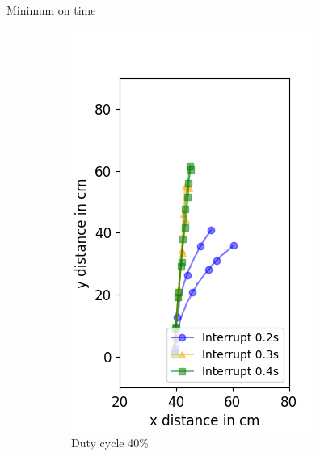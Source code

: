 \documentclass{beamer}
\begin{document}
\begin{frame}{Minimum on time}
	\begin{figure}
		\centering
		\begin{subfigure}[b]{0.28\textwidth}
			\includegraphics[width=\textwidth]{pics/figure_40.png}
			\caption*{Duty cycle 40\%}
		\end{subfigure}
		\hspace{2em}
		\begin{subfigure}[b]{0.28\textwidth}

\end{subfigure}
\end{figure}
\end{frame}
\end{document}
